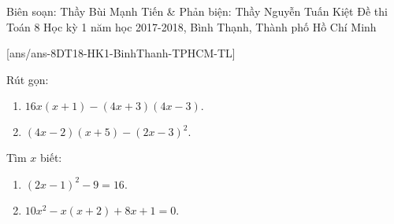 
\begin{name}
{Biên soạn: Thầy Bùi Mạnh Tiến \& Phản biện: Thầy Nguyễn Tuấn Kiệt}
{Đề thi Toán 8 Học kỳ 1 năm học 2017-2018, Bình Thạnh, Thành phố Hồ Chí Minh}
\end{name}
\setcounter{bt}{0}
[ans/ans-8DT18-HK1-BinhThanh-TPHCM-TL]

\begin{bt}%
	Rút gọn:
	\begin{multicols}{2}
		\begin{enumerate}
			\item $16x(x+1)-(4x+3)(4x-3).$
			\item $(4x-2)(x+5)-(2x-3)^2.$
		\end{enumerate}
	\end{multicols}
\end{bt}

\begin{bt}%
	Tìm $x$ biết:
	\begin{multicols}{2}
		\begin{enumerate}
			\item $(2x-1)^2-9=16.$
			\item $10x^2-x(x+2)+8x+1=0.$
		\end{enumerate}
	\end{multicols}
	\loigiai{
		\begin{enumerate}
			\item $(2x-1)^2-9=16\Leftrightarrow (2x-1)^2=25\Leftrightarrow \left[\begin{aligned} 2x-1 & =5\\ 2x-1 &=-5 \end{aligned}\right. \Leftrightarrow \left[\begin{aligned} x & =3\\ x &=-2. \end{aligned}\right.$
			\item $10x^2-x(x+2)+8x+1=0\Leftrightarrow 9x^2+6x+1=0\Leftrightarrow (3x+1)^2=0\Leftrightarrow 3x+1=0\Leftrightarrow x=-\dfrac{1}{3}.$
		\end{enumerate}
	}
\end{bt}

